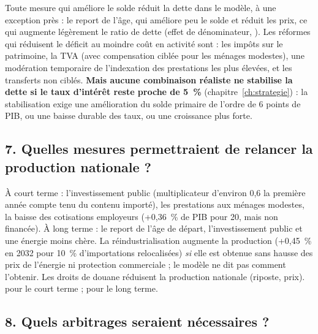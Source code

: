 Toute mesure qui améliore le solde réduit la dette dans le modèle, à une exception près : le report de l'âge, qui améliore
peu le solde et réduit les prix, ce qui augmente légèrement le ratio de dette (effet de dénominateur, ). Les
réformes qui réduisent le déficit au moindre coût en activité sont : les impôts sur le patrimoine, la TVA (avec
compensation ciblée pour les ménages modestes), une modération temporaire de l'indexation des prestations les plus
élevées, et les transferts non ciblés. \textbf{Mais aucune combinaison réaliste ne stabilise la dette si le taux d'intérêt
reste proche de 5~\%} (chapitre~\ref{ch:strategie}) : la stabilisation exige une amélioration du solde primaire de l'ordre
de 6 points de PIB, ou une baisse durable des taux, ou une croissance plus forte.

\subsection*{7. Quelles mesures permettraient de relancer la production nationale ?}

À court terme : l'investissement public (multiplicateur d'environ 0,6 la première année compte tenu du contenu importé),
les prestations aux ménages modestes, la baisse des cotisations employeurs (+0,36~\% de PIB pour 20\md, mais non
financée). À long terme : le report de l'âge de départ, l'investissement public et une énergie moins chère. La
réindustrialisation augmente la production (+0,45~\% en 2032 pour 10~\% d'importations relocalisées) \emph{si} elle est
obtenue sans hausse des prix de l'énergie ni protection commerciale ; le modèle ne dit pas comment l'obtenir. Les droits
de douane réduisent la production nationale (riposte, prix).  pour le court terme ; 
pour le long terme.

\subsection*{8. Quels arbitrages seraient nécessaires ?}

